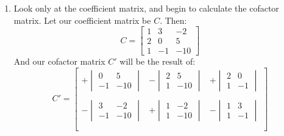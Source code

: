 \documentclass[12pt]{article}
\begin{document}
\begin{enumerate}
\item Look only at the coefficient matrix, and begin to calculate the cofactor matrix. Let our coefficient matrix be $C$. Then:
\[
C =
\begin{bmatrix}
    1 & 3 & -2 \\
    2 & 0 & 5 \\
    1 & -1 & -10
\end{bmatrix}
\]
And our cofactor matrix $C'$ will be the result of:
\[
C' =
\begin{bmatrix}
    +\begin{vmatrix}
    0 & 5\\
    -1 & -10
    \end{vmatrix} & 
    -\begin{vmatrix}
    2 & 5\\
    1 & -10
    \end{vmatrix} & 
    +\begin{vmatrix}
    2 & 0\\
    1 & -1
    \end{vmatrix}\\\\
    
    -\begin{vmatrix}
    3 & -2\\
    -1 & -10
    \end{vmatrix} & 
    +\begin{vmatrix}
    1 & -2\\
    1 & -10
    \end{vmatrix} & 
    -\begin{vmatrix}
    1 & 3\\
    1 & -1
    \end{vmatrix}\\\\
    

\end{bmatrix}\]
\end{enumerate}
\end{document}
